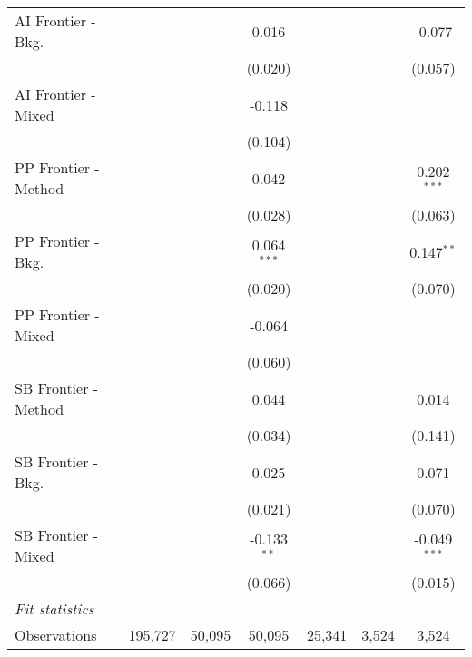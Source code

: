 \begin{tabular}{lcccccc}
   AI Frontier - Bkg.   &               &               & 0.016         &               &         & -0.077\\   
                        &               &               & (0.020)       &               &         & (0.057)\\   
   AI Frontier - Mixed  &               &               & -0.118        &               &         &   \\   
                        &               &               & (0.104)       &               &         &   \\   
   PP Frontier - Method &               &               & 0.042         &               &         & 0.202$^{***}$\\   
                        &               &               & (0.028)       &               &         & (0.063)\\   
   PP Frontier - Bkg.   &               &               & 0.064$^{***}$ &               &         & 0.147$^{**}$\\   
                        &               &               & (0.020)       &               &         & (0.070)\\   
   PP Frontier - Mixed  &               &               & -0.064        &               &         &   \\   
                        &               &               & (0.060)       &               &         &   \\   
   SB Frontier - Method &               &               & 0.044         &               &         & 0.014\\   
                        &               &               & (0.034)       &               &         & (0.141)\\   
   SB Frontier - Bkg.   &               &               & 0.025         &               &         & 0.071\\   
                        &               &               & (0.021)       &               &         & (0.070)\\   
   SB Frontier - Mixed  &               &               & -0.133$^{**}$ &               &         & -0.049$^{***}$\\   
                        &               &               & (0.066)       &               &         & (0.015)\\   
   \midrule
   \emph{Fit statistics}\\
   Observations         & 195,727       & 50,095        & 50,095        & 25,341        & 3,524   & 3,524\\  

\end{tabular}
